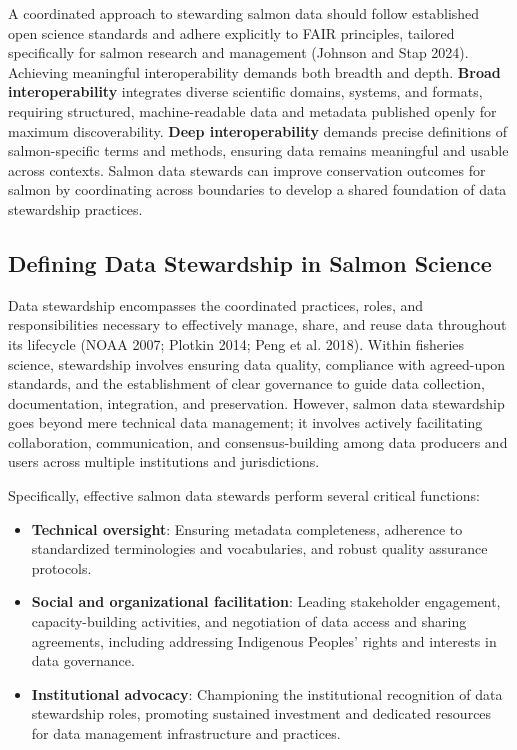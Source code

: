 \documentclass[
  letterpaper,
  DIV=11,
  numbers=noendperiod]{scrartcl}
\begin{document}
A coordinated approach to stewarding salmon data should follow
established open science standards and adhere explicitly to FAIR
principles, tailored specifically for salmon research and management
(Johnson and Stap 2024). Achieving meaningful interoperability demands
both breadth and depth. \textbf{Broad interoperability} integrates
diverse scientific domains, systems, and formats, requiring structured,
machine-readable data and metadata published openly for maximum
discoverability. \textbf{Deep interoperability} demands precise
definitions of salmon-specific terms and methods, ensuring data remains
meaningful and usable across contexts. Salmon data stewards can improve
conservation outcomes for salmon by coordinating across boundaries to
develop a shared foundation of data stewardship practices.

\subsection{Defining Data Stewardship in Salmon
Science}\label{defining-data-stewardship-in-salmon-science}

Data stewardship encompasses the coordinated practices, roles, and
responsibilities necessary to effectively manage, share, and reuse data
throughout its lifecycle (NOAA 2007; Plotkin 2014; Peng et al. 2018).
Within fisheries science, stewardship involves ensuring data quality,
compliance with agreed-upon standards, and the establishment of clear
governance to guide data collection, documentation, integration, and
preservation. However, salmon data stewardship goes beyond mere
technical data management; it involves actively facilitating
collaboration, communication, and consensus-building among data
producers and users across multiple institutions and jurisdictions.

Specifically, effective salmon data stewards perform several critical
functions:

\begin{itemize}
\item
  \textbf{Technical oversight}: Ensuring metadata completeness,
  adherence to standardized terminologies and vocabularies, and robust
  quality assurance protocols.
\item
  \textbf{Social and organizational facilitation}: Leading stakeholder
  engagement, capacity-building activities, and negotiation of data
  access and sharing agreements, including addressing Indigenous
  Peoples' rights and interests in data governance.
\item
  \textbf{Institutional advocacy}: Championing the institutional
  recognition of data stewardship roles, promoting sustained investment
  and dedicated resources for data management infrastructure and
  practices.
\end{itemize}
\end{document}
